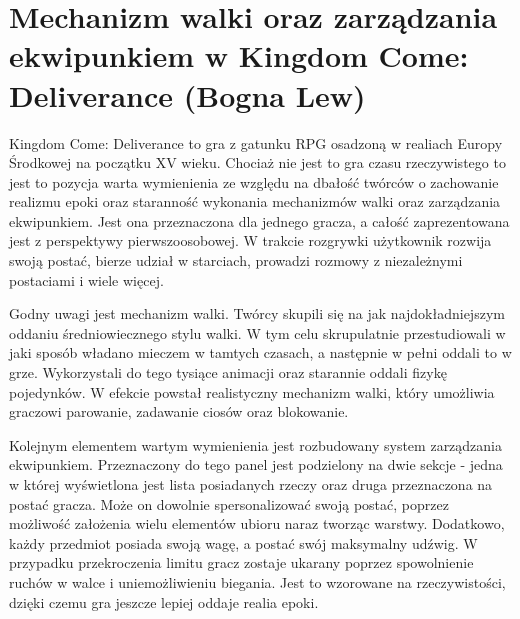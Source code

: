 \section{Mechanizm walki oraz zarządzania ekwipunkiem w Kingdom Come: Deliverance (Bogna Lew)}

Kingdom Come: Deliverance to gra z gatunku RPG osadzoną w realiach Europy Środkowej na początku XV wieku. Chociaż nie
jest to gra czasu rzeczywistego to jest to pozycja warta wymienienia ze względu na dbałość twórców o zachowanie realizmu
epoki oraz staranność wykonania mechanizmów walki oraz zarządzania ekwipunkiem. Jest ona przeznaczona dla jednego gracza,
a całość zaprezentowana jest z perspektywy pierwszoosobowej. W trakcie rozgrywki użytkownik rozwija swoją postać, bierze
udział w starciach, prowadzi rozmowy z niezależnymi postaciami i wiele więcej.

Godny uwagi jest mechanizm walki. Twórcy skupili się na jak najdokładniejszym oddaniu średniowiecznego stylu walki. W tym
celu skrupulatnie przestudiowali w jaki sposób władano mieczem w tamtych czasach, a następnie w pełni oddali to w grze.
Wykorzystali do tego tysiące animacji oraz starannie oddali fizykę pojedynków. W efekcie powstał realistyczny mechanizm
walki, który umożliwia graczowi parowanie, zadawanie ciosów oraz blokowanie.

Kolejnym elementem wartym wymienienia jest rozbudowany system zarządzania ekwipunkiem. Przeznaczony do tego panel jest
podzielony na dwie sekcje - jedna w której wyświetlona jest lista posiadanych rzeczy oraz druga przeznaczona na postać
gracza. Może on dowolnie spersonalizować swoją postać, poprzez możliwość założenia wielu elementów ubioru naraz tworząc
warstwy.  Dodatkowo, każdy przedmiot posiada swoją wagę, a postać swój maksymalny udźwig. W przypadku przekroczenia limitu
gracz zostaje ukarany poprzez spowolnienie ruchów w walce i uniemożliwieniu biegania. Jest to wzorowane na rzeczywistości,
dzięki czemu gra jeszcze lepiej oddaje realia epoki.
